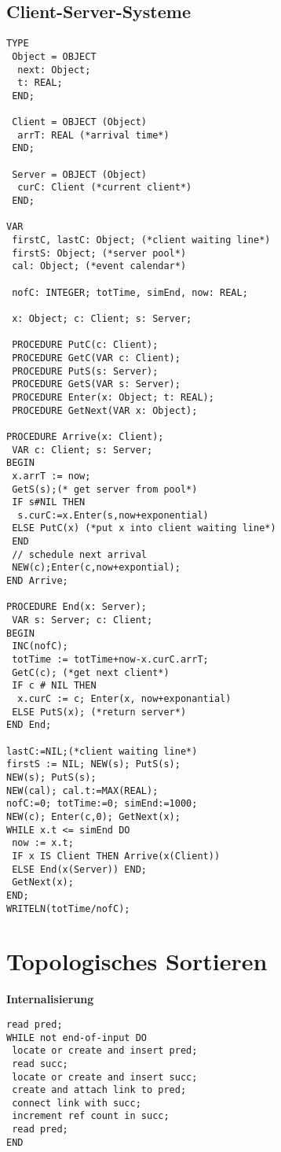 \documentclass[10pt, a4paper, twocolumn]{scrartcl}
\begin{document}
\subsection{Client-Server-Systeme}

\begin{verbatim}
TYPE
 Object = OBJECT
  next: Object;
  t: REAL;
 END;
 
 Client = OBJECT (Object)
  arrT: REAL (*arrival time*)
 END;

 Server = OBJECT (Object)
  curC: Client (*current client*)
 END;

VAR
 firstC, lastC: Object; (*client waiting line*)
 firstS: Object; (*server pool*)
 cal: Object; (*event calendar*)

 nofC: INTEGER; totTime, simEnd, now: REAL;
 
 x: Object; c: Client; s: Server;

 PROCEDURE PutC(c: Client);
 PROCEDURE GetC(VAR c: Client);
 PROCEDURE PutS(s: Server);
 PROCEDURE GetS(VAR s: Server);
 PROCEDURE Enter(x: Object; t: REAL);
 PROCEDURE GetNext(VAR x: Object);

PROCEDURE Arrive(x: Client);
 VAR c: Client; s: Server;
BEGIN
 x.arrT := now;
 GetS(s);(* get server from pool*)
 IF s#NIL THEN
  s.curC:=x.Enter(s,now+exponential)
 ELSE PutC(x) (*put x into client waiting line*)
 END
 // schedule next arrival
 NEW(c);Enter(c,now+expontial);
END Arrive;

PROCEDURE End(x: Server);
 VAR s: Server; c: Client;
BEGIN
 INC(nofC);
 totTime := totTime+now-x.curC.arrT;
 GetC(c); (*get next client*)
 IF c # NIL THEN 
  x.curC := c; Enter(x, now+exponantial)
 ELSE PutS(x); (*return server*)
END End;

lastC:=NIL;(*client waiting line*)
firstS := NIL; NEW(s); PutS(s);
NEW(s); PutS(s);
NEW(cal); cal.t:=MAX(REAL);
nofC:=0; totTime:=0; simEnd:=1000;
NEW(c); Enter(c,0); GetNext(x);
WHILE x.t <= simEnd DO 
 now := x.t;
 IF x IS Client THEN Arrive(x(Client))
 ELSE End(x(Server)) END;
 GetNext(x);
END;
WRITELN(totTime/nofC);

\end{verbatim}

\section{Topologisches Sortieren}

{\bf Internalisierung}
\begin{verbatim}
read pred;
WHILE not end-of-input DO
 locate or create and insert pred;
 read succ;
 locate or create and insert succ;
 create and attach link to pred;
 connect link with succ;
 increment ref count in succ;
 read pred;
END
\end{verbatim}
\end{document}
